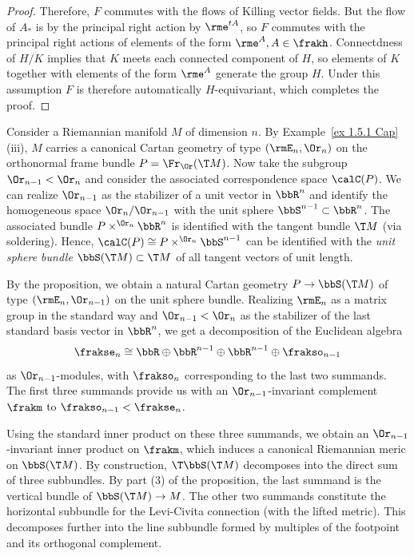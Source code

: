 \begin{proof}
    Therefore, $F$ commutes with the flows of Killing vector fields. But the flow of $A_\ast$ is by the principal right action by $\rme^{tA}$, so $F$ commutes with the principal right actions of elements of the form $\rme^A,A\in\frakh$. Connectdness of $H\slash K$ implies that $K$ meets each connected component of $H$, so elements of $K$ together with elements of the form $\rme^A$ generate the group $H$. Under this assumption $F$ is therefore automatically $H$-equivariant, which completes the proof.
\end{proof}

\begin{example}
    Consider a Riemannian manifold $M$ of dimension $n$. By Example~\ref{ex 1.5.1 Cap}(iii), $M$ carries a canonical Cartan geometry of type $(\rmE_n,\Or_n)$ on the orthonormal frame bundle $P=\Fr_{\Or}(\T M)$. Now take the subgroup $\Or_{n-1}<\Or_n$ and consider the associated correspondence space $\calC(P)$. We can realize $\Or_{n-1}$ as the stabilizer of a unit vector in $\bbR^n$ and identify the homogeneous space $\Or_n\slash \Or_{n-1}$ with the unit sphere $\bbS^{n-1}\subset \bbR^n$. The associated bundle $P\times^{\Or_n}\bbR^n$ is identified with the tangent bundle $\T M$ (via soldering). Hence, $\calC(P)\cong P\times^{\Or_n}\bbS^{n-1}$ can be identified with the \emph{unit sphere bundle} $\bbS(\T M)\subset \T M$ of all tangent vectors of unit length.

    By the proposition, we obtain a natural Cartan geometry $P\to \bbS(\T M)$ of type $(\rmE_n,\Or_{n-1})$ on the unit sphere bundle. Realizing $\rmE_n$ as a matrix group in the standard way and $\Or_{n-1}<\Or_n$ as the stabilizer of the last standard basis vector in $\bbR^n$, we get a decomposition of the Euclidean algebra
    \[\frakse_n\cong \bbR\oplus\bbR^{n-1}\oplus\bbR^{n-1}\oplus \frakso_{n-1}\] 
    as $\Or_{n-1}$-modules, with $\frakso_n$ corresponding to the last two summands. The first three summands provide us with an $\Or_{n-1}$-invariant complement $\frakm$ to $\frakso_{n-1}<\frakse_n$.

    Using the standard inner product on these three summands, we obtain an $\Or_{n-1}$-invariant inner product on $\frakm$, which induces a canonical Riemannian meric on $\bbS(\T M)$. By construction, $\T \bbS(\T M)$ decomposes into the direct sum of three subbundles. By part (3) of the proposition, the last summand is the vertical bundle of $\bbS(\T M)\to M$. The other two summands constitute the horizontal subbundle for the Levi-Civita connection (with the lifted metric). This decomposes further into the line subbundle formed by multiples of the footpoint and its orthogonal complement.
\end{example}


